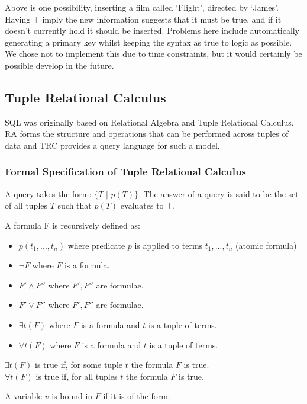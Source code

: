 \documentclass[a4paper, 11pt]{article}
\begin{document}
    Above is one possibility, inserting a film called `Flight', directed by
    `James'. Having $\top$ imply the new information suggests that it must be
    true, and if it doesn't currently hold it should be inserted. Problems here
    include automatically generating a primary key whilst keeping the syntax as
    true to logic as possible. We chose not to implement this due to time
    constraints, but it would certainly be possible develop in the future.

  \subsection{Tuple Relational Calculus}
    SQL was originally based on Relational Algebra and Tuple Relational
    Calculus. RA forms the structure and operations that can be performed
    across tuples of data and TRC provides a query language for such a model.

    \subsubsection{Formal Specification of Tuple Relational Calculus\cite{lecRA}}
      \label{sec:formalTRC}
      A query takes the form: $\{T\text{ | }p(T)\}$. The answer of a query is
      said to be the set of all tuples $T$ such that $p(T)$ evaluates to $\top$.

      A formula F is recursively defined as:
      \begin{itemize}
        \item $p(t_1, ..., t_n)$ where predicate $p$ is applied to terms $t_1, ..., t_n$ (atomic formula)
        \item $\lnot F$ where $F$ is a formula.
        \item $F' \land F''$ where $F', F''$ are formulae.
        \item $F' \lor F''$ where $F', F''$ are formulae.
        \item $\exists t(F)$ where $F$ is a formula and $t$ is a tuple of terms.
        \item $\forall t(F)$ where $F$ is a formula and $t$ is a tuple of terms.
      \end{itemize}

      $\exists t(F)$ is true if, for some tuple $t$ the formula $F$ is true. \\
      $\forall t(F)$ is true if, for all tuples $t$ the formula $F$ is true.

      A variable $v$ is bound in $F$ if it is of the form:
\end{document}
